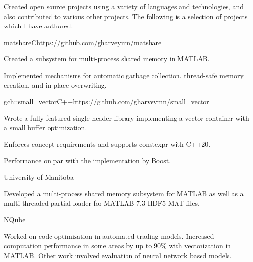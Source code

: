 \documentclass[
  9pt, %
]{FreemanCV}
\begin{document}
\begin{paracol}{2}
\begin{jobentry}{}
  Created open source projects using a variety of languages and technologies, and also contributed
  to various other projects. The following is a selection of projects which I have authored.

  \begin{description}[
    noitemsep,
    topsep=0pt,
    labelindent=1em,
    leftmargin=*,
    labelsep=0pt,
    rightmargin=1em
  ]
    \item
    \begin{project*}{matshare}{C}{https://github.com/gharveymn/matshare}
      \item Created a subsystem for multi-process shared memory in MATLAB.
      \item Implemented mechanisms for automatic garbage collection, thread-safe
            memory creation, and in-place overwriting.
    \end{project*}

    \item
    \begin{project*}{gch::small\_vector}{C++}{https://github.com/gharveymn/small\_vector}
      \item Wrote a fully featured single header library implementing a vector container with a small buffer optimization.
      \item Enforces concept requirements and supports constexpr with C++20.
      \item Performance on par with the implementation by Boost.
    \end{project*}
  \end{description}
\end{jobentry}

\begin{employer}{University of Manitoba}{}
  \begin{jobentry}{}
    Developed a multi-process shared memory subsystem for MATLAB as well as a multi-threaded
    partial loader for MATLAB 7.3 HDF5 MAT-files.
  \end{jobentry}
\end{employer}

\begin{employer}{NQube}{}
  \begin{jobentry}{}
    Worked on code optimization in automated trading models. Increased computation performance
    in some areas by up to 90\% with vectorization in MATLAB. Other work involved evaluation of
    neural network based models.
  \end{jobentry}
\end{employer}


\end{paracol}
\end{document}
